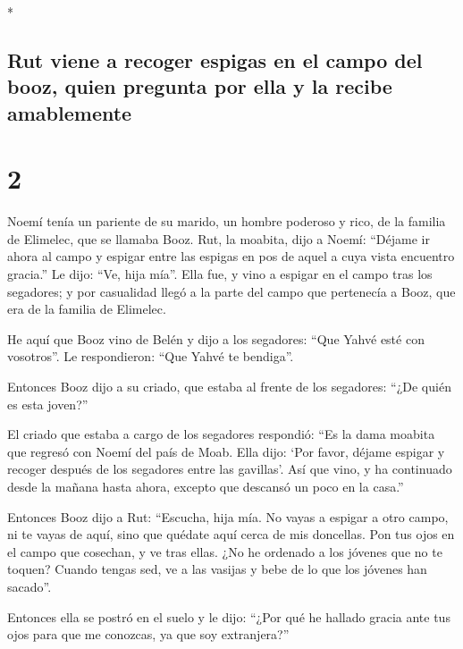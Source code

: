\begin{paracol}{2}
\begin{otherlanguage}{english}
\end{otherlanguage}

\switchcolumn[0]*

\hypertarget{rut-viene-a-recoger-espigas-en-el-campo-del-booz-quien-pregunta-por-ella-y-la-recibe-amablemente}{%
\subsection{Rut viene a recoger espigas en el campo del booz, quien
pregunta por ella y la recibe
amablemente}\label{rut-viene-a-recoger-espigas-en-el-campo-del-booz-quien-pregunta-por-ella-y-la-recibe-amablemente}}

\hypertarget{section-2}{%
\section{2}\label{section-2}}

 Noemí tenía un pariente de su marido, un hombre poderoso
y rico, de la familia de Elimelec, que se llamaba Booz. 
Rut, la moabita, dijo a Noemí: ``Déjame ir ahora al campo y espigar
entre las espigas en pos de aquel a cuya vista encuentro gracia.'' Le
dijo: ``Ve, hija mía''.  Ella fue, y vino a espigar en el
campo tras los segadores; y por casualidad llegó a la parte del campo
que pertenecía a Booz, que era de la familia de Elimelec.

 He aquí que Booz vino de Belén y dijo a los segadores:
``Que Yahvé esté con vosotros''. Le respondieron: ``Que Yahvé te
bendiga''.

 Entonces Booz dijo a su criado, que estaba al frente de
los segadores: ``¿De quién es esta joven?''

 El criado que estaba a cargo de los segadores respondió:
``Es la dama moabita que regresó con Noemí del país de Moab.
 Ella dijo: `Por favor, déjame espigar y recoger después
de los segadores entre las gavillas'. Así que vino, y ha continuado
desde la mañana hasta ahora, excepto que descansó un poco en la casa.''

 Entonces Booz dijo a Rut: ``Escucha, hija mía. No vayas a
espigar a otro campo, ni te vayas de aquí, sino que quédate aquí cerca
de mis doncellas.  Pon tus ojos en el campo que cosechan,
y ve tras ellas. ¿No he ordenado a los jóvenes que no te toquen? Cuando
tengas sed, ve a las vasijas y bebe de lo que los jóvenes han sacado''.

 Entonces ella se postró en el suelo y le dijo: ``¿Por
qué he hallado gracia ante tus ojos para que me conozcas, ya que soy
extranjera?''


\end{paracol}
